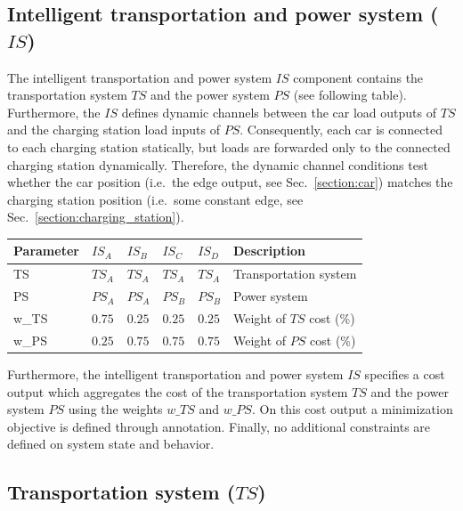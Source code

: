 \subsection{Intelligent transportation and power system ($IS$)}
\label{section:intelligent_system}

The intelligent transportation and power system $IS$ component contains the transportation system $TS$ and the power system $PS$ (see following table). Furthermore, the $IS$ defines dynamic channels between the car load outputs of $TS$ and the charging station load inputs of $PS$. Consequently, each car is connected to each charging station statically, but loads are forwarded only to the connected charging station dynamically. Therefore, the dynamic channel conditions test whether the car position (i.e.\ the edge output, see Sec.~\ref{section:car}) matches the charging station position (i.e.\ some constant edge, see Sec.~\ref{section:charging_station}).

\begin{table}[h]
	\renewcommand{\arraystretch}{1.3}
	\centering
	\begin{tabularx}{\columnwidth}{lllllX}
		\hline
		\textbf{Parameter}      & \textbf{$IS_{A}$} & \textbf{$IS_{B}$}  & \textbf{$IS_{C}$} & \textbf{$IS_{D}$}      & \textbf{Description} \\ \hline
		TS     					& $TS_{A}$   	& $TS_{A}$ & $TS_{A}$ & $TS_{A}$	 	& Transportation system     			\\
		PS               		& $PS_{A}$ 	& $PS_{A}$ & $PS_{B}$ & $PS_{B}$		& Power system   						\\
		w\_TS              & $0.75$  	& $0.25$ & $0.25$ & $0.25$		& Weight of $TS$ cost (\%)	\\ 
		w\_PS              & $0.25$  	& $0.75$ & $0.75$ & $0.75$  		& Weight of $PS$ cost (\%)   			\\ \hline
	\end{tabularx}
\end{table}

Furthermore, the intelligent transportation and power system $IS$ specifies a cost output which aggregates the cost of the transportation system $TS$ and the power system $PS$ using the weights $w\_TS$ and $w\_PS$. On this cost output a minimization objective is defined through annotation. Finally, no additional constraints are defined on system state and behavior.

\subsection{Transportation system ($TS$)}

